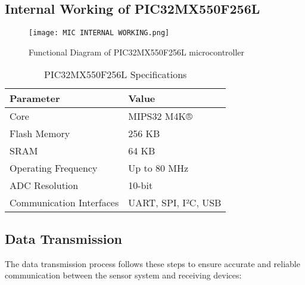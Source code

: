 \documentclass[12pt]{report}
\begin{document}
\subsection{Internal Working of PIC32MX550F256L}
\begin{figure}[H]
    \centering
    \texttt{[image: MIC INTERNAL WORKING.png]}
    \caption{Functional Diagram of PIC32MX550F256L microcontroller}
    \label{fig:pic_diagram}
\end{figure}

\begin{table}[H]
\centering
\caption{PIC32MX550F256L Specifications}
\label{tab:pic_specs}
\begin{tabular}{|l|l|}
\hline
\textbf{Parameter} & \textbf{Value} \\ \hline
Core & MIPS32 M4K® \\ \hline
Flash Memory & 256 KB \\ \hline
SRAM & 64 KB \\ \hline
Operating Frequency & Up to 80 MHz \\ \hline
ADC Resolution & 10-bit \\ \hline
Communication Interfaces & UART, SPI, I²C, USB \\ \hline
\end{tabular}
\end{table}

\subsection{Data Transmission}
The data transmission process follows these steps to ensure accurate and reliable communication between the sensor system and receiving devices:
\end{document}
